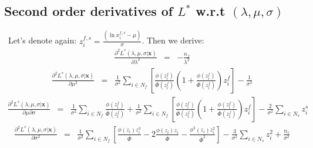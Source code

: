 \documentclass{article}
\begin{document}
\subsection{Second order derivatives of $L^*$ w.r.t $\left(\lambda, \mu, \sigma \right)$}\
\indent Let's denote again: $z_i^{f,s} = \frac{\left(\ln x_i^{f,s} - \mu \right)}{\sigma}$. Then we derive: 
\begin{eqnarray}
\frac{\partial^2 L^*(\lambda, \mu, \sigma | \textbf{x}) }{\partial \lambda^2} &=& - \frac{n_f}{\lambda ^ 2} 
\end{eqnarray} 
\begin{eqnarray}
\frac{\partial^2 L^*(\lambda, \mu, \sigma | \textbf{x}) }{\partial \mu^2} &=& \frac{1}{\sigma^2}\sum_{i \in N_f} \left[ \frac{\phi \left( z_i^f \right)}{\overline \Phi \left( z_i^f \right)}\left( 1 + \frac{\phi \left( z_i^f \right)}{\overline \Phi \left( z_i^f \right)} \right) z_i^f \right] - \frac{1}{\sigma^2} 
\end{eqnarray} 
\begin{eqnarray}
\frac{\partial^2 L^*(\lambda, \mu, \sigma | \textbf{x}) }{\partial \mu \partial\sigma} &=& \frac{1}{\sigma^2} \sum_{i \in N_f} \frac{\phi \left( z_i^f \right)}{\overline \Phi \left( z_i^f \right)} + \frac{1}{\sigma^2}\sum_{i \in N_f} \left[ \frac{\phi \left( z_i^f \right)}{\overline \Phi \left( z_i^f \right)}\left( 1 + \frac{\phi \left( z_i^f \right)}{\overline \Phi \left( z_i^f \right)} \right) z_i^f \right] - \frac{2}{\sigma^2}\sum_{i \in N_s} z_i^s 
\end{eqnarray} 
\begin{eqnarray}
\frac{\partial^2 L^*(\lambda, \mu, \sigma | \textbf{x}) }{\partial \sigma^2} &=& \frac{1}{\sigma^2} \sum_{i \in N_f} \left[ \frac{\phi (z_i) z_i^3}{\overline \Phi} - 2\frac{\phi(z_i)z_i}{\overline \Phi} - \frac{\phi^2(z_i) z_i^2}{\overline\Phi ^2} \right] - \frac{3}{\sigma^2}\sum_{i \in N_s} z_i^2 + \frac{n_s}{\sigma^2}
\end{eqnarray} 
\end{document}

